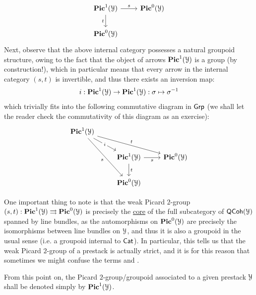 \begin{definition}
\begin{enumerate}
\begin{enumerate}
$$\begin{tikzcd}
                                        	{\Pic^1(\calY)} & {\Pic^0(\calY)} \\
                                        	{\Pic^0(\calY)}
                                        	\arrow["t"', from=1-1, to=2-1]
                                        	\arrow["s", from=1-1, to=1-2]
                                        \end{tikzcd}
                                    $$
                                Next, observe that the above internal category possesses a natural groupoid structure, owing to the fact that the object of arrows $\mathbf{Pic}^1(\mathcal{Y})$ is a group (by construction!), which in particular means that every arrow in the internal category $(s, t)$ is invertible, and thus there exists an inversion map:
                                    $$i: \mathbf{Pic}^1(\mathcal{Y}) \to \mathbf{Pic}^1(\mathcal{Y}): \sigma \mapsto \sigma^{-1}$$
                                which trivially fits into the following commutative diagram in $\mathsf{Grp}$ (we shall let the reader check the commutativity of this diagram as an exercise):
                                    $$
                                        \begin{tikzcd}
                                        	{\Pic^1(\calY)} \\
                                        	& {\Pic^1(\calY)} & {\Pic^0(\calY)} \\
                                        	& {\Pic^0(\calY)}
                                        	\arrow["t", from=2-2, to=3-2]
                                        	\arrow["s"', from=2-2, to=2-3]
                                        	\arrow["i"{description}, from=1-1, to=2-2]
                                        	\arrow["s"', from=1-1, to=3-2]
                                        	\arrow["t", from=1-1, to=2-3]
                                        \end{tikzcd}
                                    $$
                                    
                                One important thing to note is that the weak Picard $2$-group $(s, t): \mathbf{Pic}^1(\mathcal{Y}) \rightrightarrows \mathbf{Pic}^0(\mathcal{Y})$ is precisely the \href{https://ncatlab.org/nlab/show/core}{\underline{core}} of the full subcategory of $\mathsf{QCoh}(\mathcal{Y})$ spanned by line bundles, as the automorphisms on $\mathbf{Pic}^0(\mathcal{Y})$ are precisely the isomorphisms between line bundles on $\mathcal{Y}$, and thus it is also a groupoid in the usual sense (i.e. a groupoid internal to $\mathsf{Cat}$). In particular, this tells us that the weak Picard $2$-group of a prestack is actually strict, and it is for this reason that sometimes we might confuse the terms  and .
                                
                                From this point on, the Picard $2$-group/groupoid associated to a given prestack $\mathcal{Y}$ shall be denoted simply by $\mathbf{Pic}^1(\mathcal{Y})$.
                            \end{enumerate}
                    \end{enumerate}
                \end{definition}
